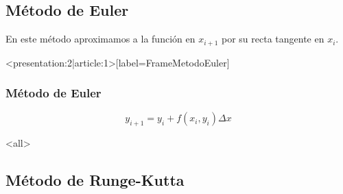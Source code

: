 \subsection{Método de Euler}

En este método aproximamos a la función en $x_{i+1}$ por su recta tangente en $x_{i}$. 

\mode*

\begin{frame}<presentation:2|article:1>[label=FrameMetodoEuler]
  \frametitle<presentation>{Método de Euler}
  \center
  \begin{equation}
    y_{i+1} = y_i + f(x_i, y_i ) \Delta x
  \end{equation}
\end{frame}
\mode<all>


\subsection{Método de Runge-Kutta}

